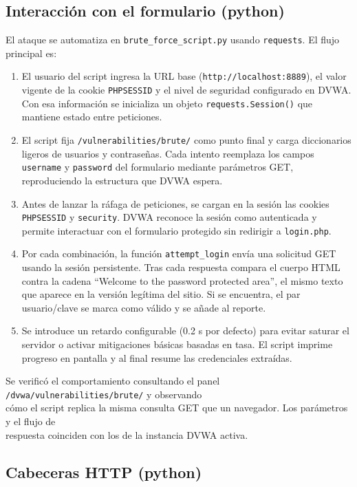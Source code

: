 \documentclass[letterpaper,12pt]{article}
\let\origsubsection\subsection
\renewcommand{\subsection}{\FloatBarrier\origsubsection}
\begin{document}
\subsection{Interacción con el formulario (python)}

El ataque se automatiza en \verb|brute_force_script.py| usando \verb|requests|. El flujo principal es:
\begin{enumerate}
    \item El usuario del script ingresa la URL base (\verb|http://localhost:8889|), el valor vigente de la cookie \verb|PHPSESSID| y el nivel de seguridad configurado en DVWA. Con esa información se inicializa un objeto \verb|requests.Session()| que mantiene estado entre peticiones.
    \item El script fija \verb|/vulnerabilities/brute/| como punto final y carga diccionarios ligeros de usuarios y contraseñas. Cada intento reemplaza los campos \verb|username| y \verb|password| del formulario mediante parámetros GET, reproduciendo la estructura que DVWA espera.
    \item Antes de lanzar la ráfaga de peticiones, se cargan en la sesión las cookies \verb|PHPSESSID| y \verb|security|. DVWA reconoce la sesión como autenticada y permite interactuar con el formulario protegido sin redirigir a \verb|login.php|.
    \item Por cada combinación, la función \verb|attempt_login| envía una solicitud GET usando la sesión persistente. Tras cada respuesta compara el cuerpo HTML contra la cadena ``Welcome to the password protected area'', el mismo texto que aparece en la versión legítima del sitio. Si se encuentra, el par usuario/clave se marca como válido y se añade al reporte.
    \item Se introduce un retardo configurable (0.2 s por defecto) para evitar saturar el servidor o activar mitigaciones básicas basadas en tasa. El script imprime progreso en pantalla y al final resume las credenciales extraídas.
\end{enumerate}

Se verificó el comportamiento consultando el panel \verb|/dvwa/vulnerabilities/brute/| y observando \\
cómo el script replica la misma consulta GET que un navegador. Los parámetros y el flujo de \\
respuesta coinciden con los de la instancia DVWA activa.

\subsection{Cabeceras HTTP (python)}
\end{document}
